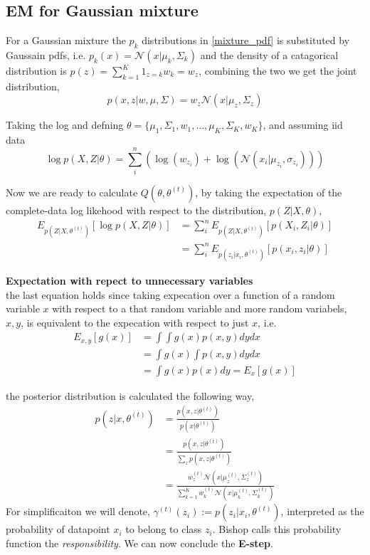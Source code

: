 \subsection*{EM for Gaussian mixture}
 For a Gaussian mixture the $p_k$ distributions in \eqref{mixture_pdf} is substituted by Gaussain pdfs, 
 i.e. $p_k(x) = \mathcal{N}(x| \mu_k , \Sigma_k)$
 and the density of a catagorical distribution is $p(z) = \sum_{k=1}^K 1_{z=k} w_k = w_z$, combining the two
 we get the joint distribution, 
 $$p(x,z|w,\mu , \Sigma) = w_z \mathcal{N}(x| \mu_z , \Sigma_z)$$

 Taking the log and defning $\theta = \{\mu_1 , \Sigma_1,w_1, \dots, \mu_K , \Sigma_K, w_K\}$, and assuming iid data
 $$\log p(X,Z| \theta) = \sum_{i}^n \left(\log(w_{z_i})+\log(\mathcal{N}(x_i| \mu_{z_i} , \sigma_{z_i}))\right)$$

Now we are ready to calculate $Q(\theta, \theta^{(t)})$, by taking the expectation of the complete-data log likehood
with respect to the distribution, $p(Z|X, \theta)$, 
\begin{align*}
    E_{p(Z|X,  \theta^{(t)})}[\log p(X,Z| \theta)] &=\sum_{i}^n  E_{p(Z|X,  \theta^{(t)})}[p(X_i,Z_i| \theta) ]\\
    &=\sum_{i}^n  E_{p(z_i|x_i,  \theta^{(t)})}[p(x_i,z_i| \theta) ]
\end{align*}

\begin{tcolorbox}[
    sharp corners,
    boxrule=0mm,
    enhanced,
    borderline west={4pt}{0pt}{gray},
    colframe=drGray,
    colback=drGray,
    coltitle=black,
]
{\large \textbf{Expectation with repect to unnecessary variables}}\\
the last equation holds since taking expecation over a function of a random variable $x$ with respect to a that random
variable and more random variabels, $x,y$, is equivalent to the expecation with respect to just $x$, i.e. 
\begin{align*}
    E_{x,y}[g(x)] &= \int\int g(x) p(x,y) dy dx\\
     &= \int g(x) \int p(x,y) dy dx \\
    &= \int g(x) p(x) dy = E_x[g(x)]
\end{align*}
\end{tcolorbox}

the posterior distribution is calculated the following way,
\begin{align*}
    p(z|x, \theta^{(t)}) &= \frac{p(x,z|\theta^{(t)})}{p(x|\theta^{(t)})} \\
    &= \frac{p(x,z|\theta^{(t)})}{\sum_{z} p(x,z|\theta^{(t)})}\\
    &= \frac{w_z^{(t)} \mathcal{N}(x|\mu_z^{(t)}, \Sigma_z^{(t)})}{\sum_{k=1}^K w_k^{(t)} 
    \mathcal{N}(x|\mu_k^{(t)}, \Sigma_k^{(t)})}
\end{align*}
For simplificaiton we will denote, $\gamma^{(t)}(z_i) := p(z_i|x_i, \theta^{(t)})$, 
interpreted as the probability of datapoint $x_i$ to belong to class $z_i$. Bishop \cite*{bishop}
calls this probability function the \textit{responsibility}. We can now conclude the \textbf{E-step}.

